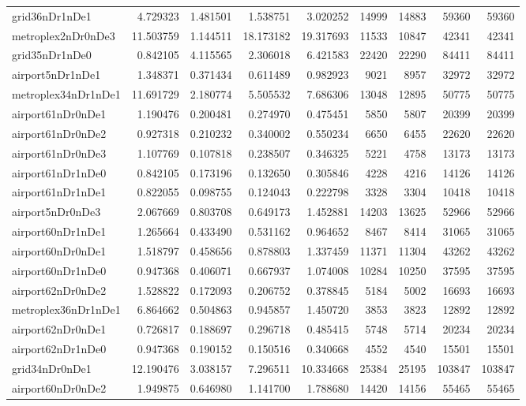 \begin{longtable}{|l|r|r|r|r|r|r|r|r|}
grid36nDr1nDe1 & 4.729323 & 1.481501 & 1.538751 & 3.020252 & 14999 & 14883 & 59360 & 59360 \\
metroplex2nDr0nDe3 & 11.503759 & 1.144511 & 18.173182 & 19.317693 & 11533 & 10847 & 42341 & 42341 \\
grid35nDr1nDe0 & 0.842105 & 4.115565 & 2.306018 & 6.421583 & 22420 & 22290 & 84411 & 84411 \\
airport5nDr1nDe1 & 1.348371 & 0.371434 & 0.611489 & 0.982923 & 9021 & 8957 & 32972 & 32972 \\
metroplex34nDr1nDe1 & 11.691729 & 2.180774 & 5.505532 & 7.686306 & 13048 & 12895 & 50775 & 50775 \\
airport61nDr0nDe1 & 1.190476 & 0.200481 & 0.274970 & 0.475451 & 5850 & 5807 & 20399 & 20399 \\
airport61nDr0nDe2 & 0.927318 & 0.210232 & 0.340002 & 0.550234 & 6650 & 6455 & 22620 & 22620 \\
airport61nDr0nDe3 & 1.107769 & 0.107818 & 0.238507 & 0.346325 & 5221 & 4758 & 13173 & 13173 \\
airport61nDr1nDe0 & 0.842105 & 0.173196 & 0.132650 & 0.305846 & 4228 & 4216 & 14126 & 14126 \\
airport61nDr1nDe1 & 0.822055 & 0.098755 & 0.124043 & 0.222798 & 3328 & 3304 & 10418 & 10418 \\
airport5nDr0nDe3 & 2.067669 & 0.803708 & 0.649173 & 1.452881 & 14203 & 13625 & 52966 & 52966 \\
airport60nDr1nDe1 & 1.265664 & 0.433490 & 0.531162 & 0.964652 & 8467 & 8414 & 31065 & 31065 \\
airport60nDr0nDe1 & 1.518797 & 0.458656 & 0.878803 & 1.337459 & 11371 & 11304 & 43262 & 43262 \\
airport60nDr1nDe0 & 0.947368 & 0.406071 & 0.667937 & 1.074008 & 10284 & 10250 & 37595 & 37595 \\
airport62nDr0nDe2 & 1.528822 & 0.172093 & 0.206752 & 0.378845 & 5184 & 5002 & 16693 & 16693 \\
metroplex36nDr1nDe1 & 6.864662 & 0.504863 & 0.945857 & 1.450720 & 3853 & 3823 & 12892 & 12892 \\
airport62nDr0nDe1 & 0.726817 & 0.188697 & 0.296718 & 0.485415 & 5748 & 5714 & 20234 & 20234 \\
airport62nDr1nDe0 & 0.947368 & 0.190152 & 0.150516 & 0.340668 & 4552 & 4540 & 15501 & 15501 \\
grid34nDr0nDe1 & 12.190476 & 3.038157 & 7.296511 & 10.334668 & 25384 & 25195 & 103847 & 103847 \\
airport60nDr0nDe2 & 1.949875 & 0.646980 & 1.141700 & 1.788680 & 14420 & 14156 & 55465 & 55465 \\

\end{longtable}
